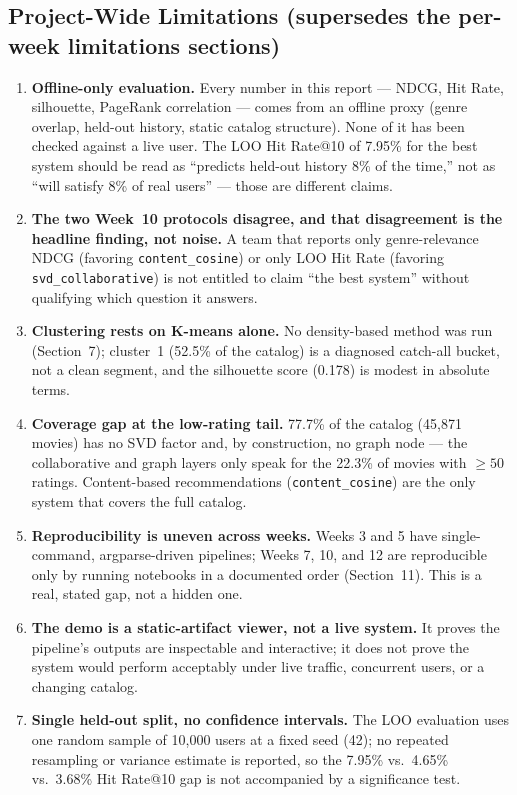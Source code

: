 \documentclass[12pt,a4paper]{article}
\begin{document}
\subsection{Project-Wide Limitations (supersedes the per-week limitations sections)}

\begin{enumerate}[nosep]
  \item \textbf{Offline-only evaluation.} Every number in this report --- NDCG, Hit Rate,
    silhouette, PageRank correlation --- comes from an offline proxy (genre overlap, held-out
    history, static catalog structure). None of it has been checked against a live user. The LOO
    Hit Rate@10 of 7.95\% for the best system should be read as ``predicts held-out history 8\% of
    the time,'' not as ``will satisfy 8\% of real users'' --- those are different claims.
  \item \textbf{The two Week~10 protocols disagree, and that disagreement is the headline finding,
    not noise.} A team that reports only genre-relevance NDCG (favoring \texttt{content\_cosine})
    or only LOO Hit Rate (favoring \texttt{svd\_collaborative}) is not entitled to claim ``the best
    system'' without qualifying which question it answers.
  \item \textbf{Clustering rests on K-means alone.} No density-based method was run (Section~7);
    cluster~1 (52.5\% of the catalog) is a diagnosed catch-all bucket, not a clean segment, and the
    silhouette score (0.178) is modest in absolute terms.
  \item \textbf{Coverage gap at the low-rating tail.} 77.7\% of the catalog (45,871 movies) has no
    SVD factor and, by construction, no graph node --- the collaborative and graph layers only
    speak for the 22.3\% of movies with $\geq50$ ratings. Content-based recommendations
    (\texttt{content\_cosine}) are the only system that covers the full catalog.
  \item \textbf{Reproducibility is uneven across weeks.} Weeks 3 and 5 have single-command,
    argparse-driven pipelines; Weeks 7, 10, and 12 are reproducible only by running notebooks in a
    documented order (Section~11). This is a real, stated gap, not a hidden one.
  \item \textbf{The demo is a static-artifact viewer, not a live system.} It proves the pipeline's
    outputs are inspectable and interactive; it does not prove the system would perform acceptably
    under live traffic, concurrent users, or a changing catalog.
  \item \textbf{Single held-out split, no confidence intervals.} The LOO evaluation uses one random
    sample of 10,000 users at a fixed seed (42); no repeated resampling or variance estimate is
    reported, so the 7.95\% vs.\ 4.65\% vs.\ 3.68\% Hit Rate@10 gap is not accompanied by a
    significance test.
\end{enumerate}
\end{document}
